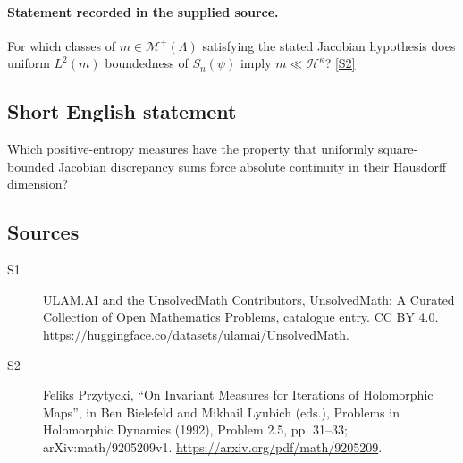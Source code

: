 \documentclass[11pt]{article}
\newcommand{\sref}[2]{\hyperlink{source:#1:#2}{[S#2]}}
\begin{document}
\paragraph{Statement recorded in the supplied source.}
For which classes of $m\in\mathcal M^+(\Lambda)$ satisfying the stated Jacobian hypothesis does uniform $L^2(m)$ boundedness of $S_n(\psi)$ imply $m\ll\mathcal H^\kappa$? \sref{statement}{2}
\subsection{Short English statement}
Which positive-entropy measures have the property that uniformly square-bounded Jacobian discrepancy sums force absolute continuity in their Hausdorff dimension?
\subsection{Sources}
\begin{description}
\item[\hypertarget{source:statement:1}{S1}] ULAM.AI and the UnsolvedMath Contributors, UnsolvedMath: A Curated Collection of Open Mathematics Problems, catalogue entry. CC BY 4.0. \url{https://huggingface.co/datasets/ulamai/UnsolvedMath}.
\item[\hypertarget{source:statement:2}{S2}] Feliks Przytycki, ``On Invariant Measures for Iterations of Holomorphic Maps'', in Ben Bielefeld and Mikhail Lyubich (eds.), Problems in Holomorphic Dynamics (1992), Problem 2.5, pp. 31--33; arXiv:math/9205209v1. \url{https://arxiv.org/pdf/math/9205209}.
\end{description}
\label{end:statement}
\end{document}
